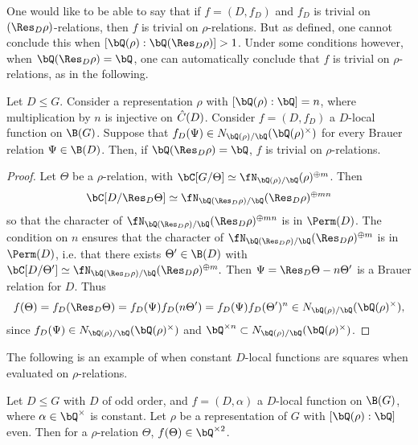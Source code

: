  One would like to be able to say that if $f = (D, f_D)$ and $f_D$ is trivial on $(\Res_D \rho)$-relations, then $f$ is trivial on $\rho$-relations. But as defined, one cannot conclude this when $[\bQ(\rho) : \bQ(\Res_D \rho) ] > 1$. Under some conditions however, when $\bQ(\Res_D \rho) = \bQ$, one can automatically conclude that $f$ is trivial on $\rho$-relations, as in the following.

\begin{prop}\label{rational-res}
Let $D \leq G$. Consider a representation $\rho$ with $[\bQ(\rho) : \bQ] = n$, where multiplication by $n$ is injective on $\hat{C}(D)$. Consider $f = (D, f_D)$ a $D$-local function on $\B(G)$. 
Suppose that $f_D(\Psi) \in \fieldnorm{\rho}$ for every Brauer relation $\Psi \in \B(D)$.
Then, if $\bQ(\Res_D \rho) = \bQ$, $f$ is trivial on $\rho$-relations.
\end{prop}

\begin{proof}
    Let $\Theta$ be a $\rho$-relation, with $\bC[G / \Theta] \simeq \repnorm{\rho}^{\oplus m}$. Then $$\bC[D / \Res_D \Theta] \simeq \repnorm{\Res_D \rho}^{\oplus m n}$$
    so that the character of $\repnorm{\Res_D \rho}^{\oplus m n}$ is in $\Perm(D)$.
    The condition on $n$ ensures that the character of $\repnorm{\Res_D \rho}^{\oplus m}$ is in $\Perm(D)$, i.e. that there exists $\Theta' \in \B(D)$ with $\bC[D / \Theta'] \simeq \repnorm{\Res_D \rho}^{\oplus m}.$ Then $\Psi = \Res_D\Theta - n\Theta'$ is a Brauer relation for $D$. Thus
    \[ f(\Theta) = f_D(\Res_D \Theta) = f_D(\Psi)f_D(n\Theta') = f_D(\Psi)f_D(\Theta')^n \in \fieldnorm{\rho}, \]
    since $f_D(\Psi) \in \fieldnorm{\rho}$ and $\bQ^{\times n} \subset \fieldnorm{\rho}$. 
\end{proof}

The following is an example of when constant $D$-local functions are squares when evaluated on $\rho$-relations.

\begin{prop}\label{const-fns}
     Let $D \leq G$ with $D$ of odd order, and $f = (D, \alpha)$ a $D$-local function on $\B(G)$, where $\alpha \in \bQ^{\times}$ is constant. Let $\rho$ be a representation of $G$ with $[\bQ(\rho) : \bQ ]$ even. Then for a $\rho$-relation $\Theta$, $f(\Theta) \in \bQ^{\times 2}$. 
\end{prop}

